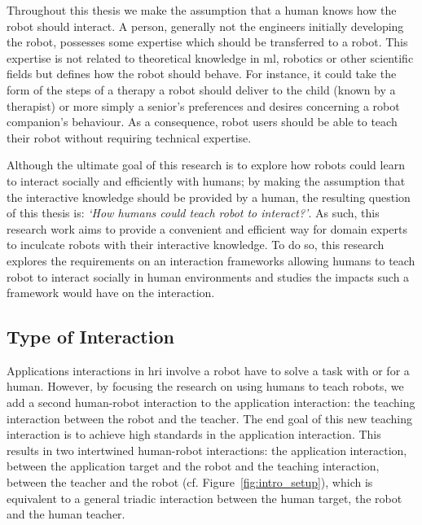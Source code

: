 Throughout this thesis we make the assumption that a human knows how the robot should interact. A person, generally not the engineers initially developing the robot, possesses some expertise which should be transferred to a robot. This expertise is not related to theoretical knowledge in \gls{ml}, robotics or other scientific fields but defines how the robot should behave. For instance,  it could take the form of the steps of a therapy a robot should deliver to the child (known by a therapist) or more simply a senior's preferences and desires concerning a robot companion's behaviour. As a consequence, robot users should be able to teach their robot%
 without requiring technical expertise.

Although the ultimate goal of this research is to explore how robots could learn to interact socially and efficiently with humans; by making the assumption that the interactive knowledge should be provided by a human, the resulting question of this thesis is: \emph{`How humans could teach robot to interact?'}. As such, this research work aims to provide a convenient and efficient way for domain experts to inculcate robots with their interactive knowledge. To do so, this research explores the requirements on an interaction frameworks allowing humans to teach robot to interact socially in human environments and studies the impacts such a framework would have on the interaction.

\subsection{Type of Interaction}
Applications interactions in \gls{hri} involve a robot have to solve a task with or for a human. However, by focusing the research on using humans to teach robots, we add a second human-robot interaction to the application interaction: the teaching interaction between the robot and the teacher. The end goal of this new teaching interaction is to achieve high standards in the application interaction. This results in two intertwined human-robot interactions: the application interaction, between the application target and the robot and the teaching interaction, between the teacher and the robot (cf. Figure~\ref{fig:intro_setup}), which is equivalent to a general triadic interaction between the human target, the robot and the human teacher.

